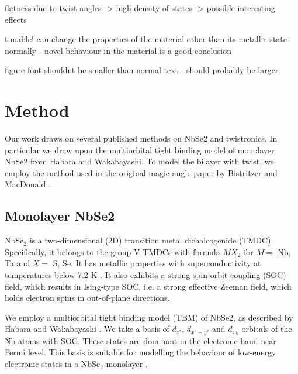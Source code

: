 \documentclass[12pt]{report} %
\begin{document}
flatness due to twist angles -> high density of states -> possible interesting effects

tunable! can change the properties of the material other than its metallic state normally - novel behaviour in the material is a good conclusion

figure font shouldnt be smaller than normal text - should probably be larger

\section*{Method}
  Our work draws on several published methods on NbSe2 and twistronics. In particular we draw upon the multiorbital tight binding model of monolayer NbSe2 from Habara and Wakabayashi\cite{Habara2021}. To model the bilayer with twist, we employ the method used in the original magic-angle paper by Bistritzer and MacDonald \cite{Bistritzer2011}. 

\subsection*{Monolayer NbSe2}
  NbSe$_2$ is a two-dimensional (2D) transition metal dichalcogenide (TMDC). Specifically, it belongs to the group V TMDCs with formula $MX_2$ for $M =$ Nb, Ta and $X =$ S, Se. It has metallic properties with superconductivity at temperatures below 7.2 K \cite{}. It also exhibits a strong spin-orbit coupling (SOC) field, which results in Ising-type SOC, i.e. a strong effective Zeeman field, which holds electron spins in out-of-plane directions.

  We employ a multiorbital tight binding model (TBM) of NbSe2, as described by Habara and Wakabayashi \cite{Habara2021}. We take a basis of $d_{z^2}$, $d_{x^2 - y^2}$ and $d_{xy}$ orbitals of the Nb atoms with SOC. These states are dominant in the electronic band near Fermi level. This basis is suitable for modelling the behaviour of low-energy electronic states in a NbSe$_2$ monolayer \cite{}.
\end{document}
